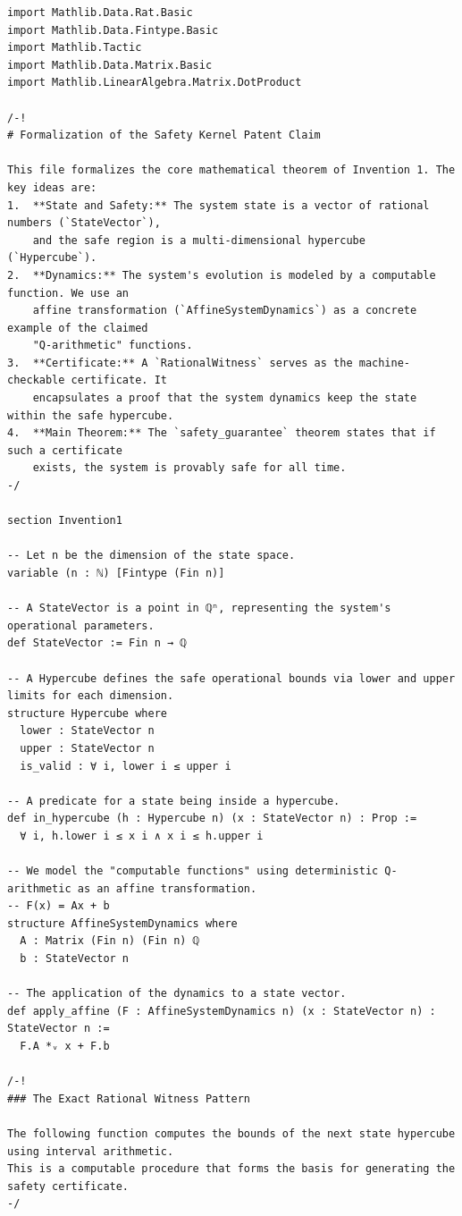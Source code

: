 \documentclass{article}
\begin{document}
\begin{verbatim}
import Mathlib.Data.Rat.Basic
import Mathlib.Data.Fintype.Basic
import Mathlib.Tactic
import Mathlib.Data.Matrix.Basic
import Mathlib.LinearAlgebra.Matrix.DotProduct

/-!
# Formalization of the Safety Kernel Patent Claim

This file formalizes the core mathematical theorem of Invention 1. The key ideas are:
1.  **State and Safety:** The system state is a vector of rational numbers (`StateVector`),
    and the safe region is a multi-dimensional hypercube (`Hypercube`).
2.  **Dynamics:** The system's evolution is modeled by a computable function. We use an
    affine transformation (`AffineSystemDynamics`) as a concrete example of the claimed
    "Q-arithmetic" functions.
3.  **Certificate:** A `RationalWitness` serves as the machine-checkable certificate. It
    encapsulates a proof that the system dynamics keep the state within the safe hypercube.
4.  **Main Theorem:** The `safety_guarantee` theorem states that if such a certificate
    exists, the system is provably safe for all time.
-/

section Invention1

-- Let n be the dimension of the state space.
variable (n : ℕ) [Fintype (Fin n)]

-- A StateVector is a point in ℚⁿ, representing the system's operational parameters.
def StateVector := Fin n → ℚ

-- A Hypercube defines the safe operational bounds via lower and upper limits for each dimension.
structure Hypercube where
  lower : StateVector n
  upper : StateVector n
  is_valid : ∀ i, lower i ≤ upper i

-- A predicate for a state being inside a hypercube.
def in_hypercube (h : Hypercube n) (x : StateVector n) : Prop :=
  ∀ i, h.lower i ≤ x i ∧ x i ≤ h.upper i

-- We model the "computable functions" using deterministic Q-arithmetic as an affine transformation.
-- F(x) = Ax + b
structure AffineSystemDynamics where
  A : Matrix (Fin n) (Fin n) ℚ
  b : StateVector n

-- The application of the dynamics to a state vector.
def apply_affine (F : AffineSystemDynamics n) (x : StateVector n) : StateVector n :=
  F.A *ᵥ x + F.b

/-!
### The Exact Rational Witness Pattern

The following function computes the bounds of the next state hypercube using interval arithmetic.
This is a computable procedure that forms the basis for generating the safety certificate.
-/


\end{verbatim}
\end{document}

